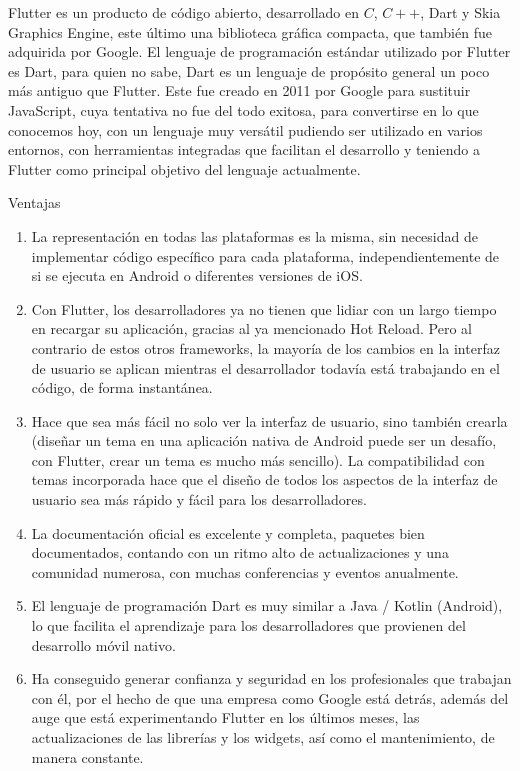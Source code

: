 Flutter es un producto de código abierto, desarrollado en $C$, $C++$, Dart y Skia Graphics Engine, este último una biblioteca gráfica compacta, que también fue adquirida por Google. El lenguaje de programación estándar utilizado por Flutter es Dart, para quien no sabe, Dart es un lenguaje de propósito general un poco más antiguo que Flutter. Este fue creado en 2011 por Google para sustituir JavaScript, cuya tentativa no fue del todo exitosa, para convertirse en lo que conocemos hoy, con un lenguaje muy versátil pudiendo ser utilizado en varios entornos, con herramientas integradas que facilitan el desarrollo y teniendo a Flutter como principal objetivo del lenguaje actualmente.

Ventajas
\begin{enumerate}

\item	La representación en todas las plataformas es la misma, sin necesidad de implementar código específico para cada plataforma, independientemente de si se ejecuta en Android o diferentes versiones de iOS.
\item	Con Flutter, los desarrolladores ya no tienen que lidiar con un largo tiempo en recargar su aplicación, gracias al ya mencionado Hot Reload. Pero al contrario de estos otros frameworks, la mayoría de los cambios en la interfaz de usuario se aplican mientras el desarrollador todavía está trabajando en el código, de forma instantánea.
\item	Hace que sea más fácil no solo ver la interfaz de usuario, sino también crearla (diseñar un tema en una aplicación nativa de Android puede ser un desafío, con Flutter, crear un tema es mucho más sencillo). La compatibilidad con temas incorporada hace que el diseño de todos los aspectos de la interfaz de usuario sea más rápido y fácil para los desarrolladores.
\item	La documentación oficial es excelente y completa, paquetes bien documentados, contando con un ritmo alto de actualizaciones y una comunidad numerosa, con muchas conferencias y eventos anualmente.
\item	El lenguaje de programación Dart es muy similar a Java / Kotlin (Android), lo que facilita el aprendizaje para los desarrolladores que provienen del desarrollo móvil nativo.
\item	Ha conseguido generar confianza y seguridad en los profesionales que trabajan con él, por el hecho de que una empresa como Google está detrás, además del auge que está experimentando Flutter en los últimos meses, las actualizaciones de las librerías y los widgets, así como el mantenimiento, de manera constante.

\end{enumerate}

